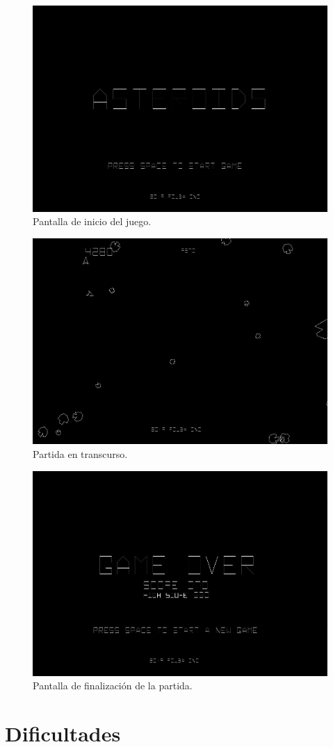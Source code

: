\documentclass[a4paper, 12pt, spanish]{article}
\begin{document}
\begin{figure}[h]
 	\centering
	\includegraphics[width=12cm]{start_screen}
	\caption{Pantalla de inicio del juego.}
\end{figure}



\begin{figure}[h]
 	\centering
	\includegraphics[width=12cm]{juego} 
	\caption{Partida en transcurso.}
\end{figure}

\begin{figure}[h]
 	\centering
	\includegraphics[width=12cm]{game_over_screen}
	\caption{Pantalla de finalización de la partida.}
\end{figure}


\section*{Dificultades}
\end{document}
